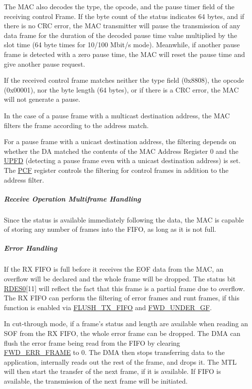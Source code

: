 \documentclass[main\_\_EN.tex]{subfiles}
\begin{document}
The MAC also decodes the type, the opcode, and the pause timer field of the receiving control Frame. If the byte count of the status indicates 64 bytes, and if there is no CRC error, the MAC transmitter will pause the transmission of any data frame for the duration of the decoded pause time value multiplied by the slot time (64 byte times for 10/100 Mbit/s mode). Meanwhile, if another pause frame is detected with a zero pause time, the MAC will reset the pause time and give another pause request.

If the received control frame matches neither the type field (0x8808), the opcode (0x00001), nor the byte length (64 bytes), or if there is a CRC error, the MAC will not generate a pause.

In the case of a pause frame with a multicast destination address, the MAC filters the frame according to the address match.

For a pause frame with a unicast destination address, the filtering depends on whether the DA matched the contents of the MAC Address Register 0 and the \hyperref[regdesc:EMACFLOWCONTROLREG]{UPFD} (detecting a pause frame even with a unicast destination address) is set. The \hyperref[regdesc:EMACFFREG]{PCF} register controls the filtering for control frames in addition to the address filter.

\subparagraph{Receive Operation Multiframe Handling}
Since the status is available immediately following the data, the MAC is capable of storing any number of frames into the FIFO, as long as it is not full.

\subparagraph{Error Handling}
If the RX FIFO is full before it receives the EOF data from the MAC, an overflow will be declared and the whole frame will be dropped. The status bit \hyperref[tab:ethernetmac-RDES0]{RDES0}[11] will reflect the fact that this frame is a partial frame due to overflow. The RX FIFO can perform the filtering of error frames and runt frames, if this function is enabled via \hyperref[regdesc:DMAOPERATIONMODEREG]{FLUSH\_TX\_FIFO} and \hyperref[regdesc:DMAOPERATIONMODEREG]{FWD\_UNDER\_GF}.

In cut-through mode, if a frame's status and length are available when reading an SOF from the RX FIFO, the whole error frame can be dropped. The DMA can flush the error frame being read from the FIFO by clearing \hyperref[regdesc:DMAOPERATIONMODEREG]{FWD\_ERR\_FRAME} to 0. The DMA then stops transferring data to the application, internally reads out the rest of the frame, and drops it. The MTL will then start the transfer of the next frame, if it is available. If FIFO is available, the transmission of the next frame will be initiated.
\end{document}
